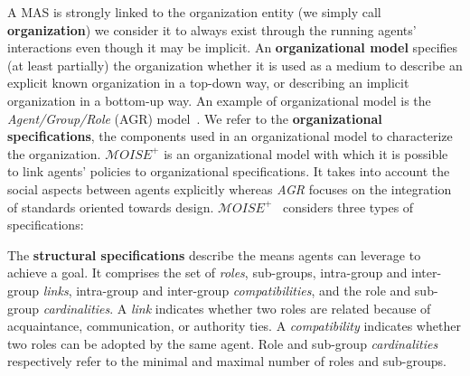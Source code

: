 \documentclass[runningheads]{llncs}
\begin{document}
A MAS is strongly linked to the organization entity (we simply call \textbf{organization}) we consider it to always exist through the running agents' interactions even though it may be implicit.
%
%
An \textbf{organizational model} specifies (at least partially) the organization whether it is used as a medium to describe an explicit known organization in a top-down way, or describing an implicit organization in a bottom-up way. An example of organizational model is the \emph{Agent/Group/Role} (AGR) model~\cite{Ferber2004}. We refer to the \textbf{organizational specifications}, the components used in an organizational model to characterize the organization. $\mathcal{M}OISE^+$ is an organizational model with which it is possible to link agents' policies to organizational specifications. It takes into account the social aspects between agents explicitly whereas \emph{AGR} focuses on the integration of standards oriented towards design. $\mathcal{M}OISE^+$~\cite{Hubner2007} considers three types of specifications:

The \textbf{structural specifications} describe the means agents can leverage to achieve a goal. It comprises the set of \emph{roles}, sub-groups, intra-group and inter-group \emph{links}, intra-group and inter-group \emph{compatibilities}, and the role and sub-group \emph{cardinalities}.
A \emph{link} indicates whether two roles are related because of acquaintance, communication, or authority ties. A \emph{compatibility} indicates whether two roles can be adopted by the same agent. Role and sub-group \emph{cardinalities} respectively refer to the minimal and maximal number of roles and sub-groups.
\end{document}
